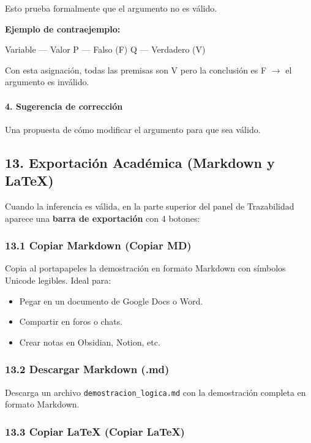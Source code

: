 \documentclass[11pt,a4paper]{article}
\begin{document}
Esto prueba formalmente que el argumento no es válido.

\textbf{Ejemplo de contraejemplo:}

Variable --- Valor
P --- Falso (F)
Q --- Verdadero (V)

Con esta asignación, todas las premisas son V pero la conclusión es F $ \to $ el argumento es inválido.

\paragraph{4. Sugerencia de corrección}
Una propuesta de cómo modificar el argumento para que sea válido.

\hrulefill

\subsection{13. Exportación Académica (Markdown y LaTeX)}

Cuando la inferencia es válida, en la parte superior del panel de Trazabilidad aparece una \textbf{barra de exportación} con 4 botones:

\subsubsection{13.1 Copiar Markdown (Copiar MD)}

Copia al portapapeles la demostración en formato Markdown con símbolos Unicode legibles. Ideal para:
\begin{itemize}[leftmargin=*]
\item Pegar en un documento de Google Docs o Word.
\item Compartir en foros o chats.
\item Crear notas en Obsidian, Notion, etc.
\end{itemize}

\subsubsection{13.2 Descargar Markdown (.md)}

Descarga un archivo \texttt{demostracion\_logica.md} con la demostración completa en formato Markdown.

\subsubsection{13.3 Copiar LaTeX (Copiar LaTeX)}
\end{document}
